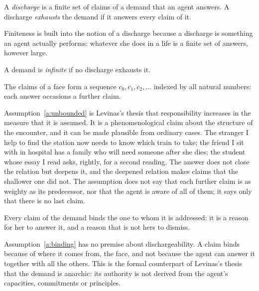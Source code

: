 \documentclass{situationist-preprint}
\begin{document}
\begin{definition}\label{d:discharge}
A \emph{discharge} is a finite set of claims of a demand that an agent answers. A discharge \emph{exhausts} the demand if it answers every claim of it.
\end{definition}

Finiteness is built into the notion of a discharge because a discharge is something an agent actually performs: whatever she does in a life is a finite set of answers, however large.

\begin{definition}\label{d:infinite}
A demand is \emph{infinite} if no discharge exhausts it.
\end{definition}

\begin{assumption}[Unboundedness]\label{a:unbounded}
The claims of a face form a sequence $c_0, c_1, c_2, \dots$ indexed by all natural numbers: each answer occasions a further claim.
\end{assumption}

Assumption~\ref{a:unbounded} is Levinas's thesis that responsibility increases in the measure that it is assumed. It is a phenomenological claim about the structure of the encounter, and it can be made plausible from ordinary cases. The stranger I help to find the station now needs to know which train to take; the friend I sit with in hospital has a family who will need someone after she dies; the student whose essay I read asks, rightly, for a second reading. The answer does not close the relation but deepens it, and the deepened relation makes claims that the shallower one did not. The assumption does not say that each further claim is as weighty as its predecessor, nor that the agent is aware of all of them; it says only that there is no last claim.

\begin{assumption}\label{a:binding}
Every claim of the demand binds the one to whom it is addressed: it is a reason for her to answer it, and a reason that is not hers to dismiss.
\end{assumption}

Assumption~\ref{a:binding} has no premise about dischargeability. A claim binds because of where it comes from, the face, and not because the agent can answer it together with all the others. This is the formal counterpart of Levinas's thesis that the demand is anarchic: its authority is not derived from the agent's capacities, commitments or principles.
\end{document}
